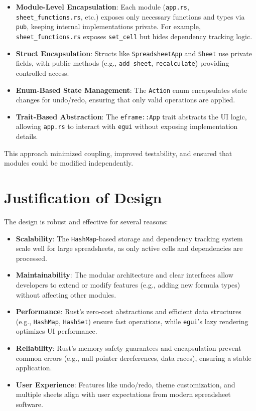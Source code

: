 \documentclass{article}
\begin{document}
\begin{itemize}
    \item \textbf{Module-Level Encapsulation}: Each module (\texttt{app.rs}, \texttt{sheet\_functions.rs}, etc.) exposes only necessary functions and types via \texttt{pub}, keeping internal implementations private. For example, \texttt{sheet\_functions.rs} exposes \texttt{set\_cell} but hides dependency tracking logic.
    \item \textbf{Struct Encapsulation}: Structs like \texttt{SpreadsheetApp} and \texttt{Sheet} use private fields, with public methods (e.g., \texttt{add\_sheet}, \texttt{recalculate}) providing controlled access.
    \item \textbf{Enum-Based State Management}: The \texttt{Action} enum encapsulates state changes for undo/redo, ensuring that only valid operations are applied.
    \item \textbf{Trait-Based Abstraction}: The \texttt{eframe::App} trait abstracts the UI logic, allowing \texttt{app.rs} to interact with \texttt{egui} without exposing implementation details.
\end{itemize}

This approach minimized coupling, improved testability, and ensured that modules could be modified independently.

\section{Justification of Design}
The design is robust and effective for several reasons:

\begin{itemize}
    \item \textbf{Scalability}: The \texttt{HashMap}-based storage and dependency tracking system scale well for large spreadsheets, as only active cells and dependencies are processed.
    \item \textbf{Maintainability}: The modular architecture and clear interfaces allow developers to extend or modify features (e.g., adding new formula types) without affecting other modules.
    \item \textbf{Performance}: Rust’s zero-cost abstractions and efficient data structures (e.g., \texttt{HashMap}, \texttt{HashSet}) ensure fast operations, while \texttt{egui}’s lazy rendering optimizes UI performance.
    \item \textbf{Reliability}: Rust’s memory safety guarantees and encapsulation prevent common errors (e.g., null pointer dereferences, data races), ensuring a stable application.
    \item \textbf{User Experience}: Features like undo/redo, theme customization, and multiple sheets align with user expectations from modern spreadsheet software.
\end{itemize}
\end{document}
